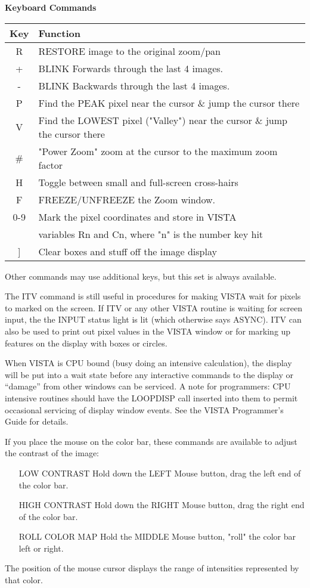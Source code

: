 \begin{center}
{\bf Keyboard Commands}\\
\begin{tabular}{cl}
\hline
Key & Function\\
\hline
 R &RESTORE image to the original zoom/pan\\
 + &BLINK Forwards through the last 4 images.\\
 - &BLINK Backwards through the last 4 images.\\
 P &Find the PEAK pixel near the cursor \& jump the cursor there\\
 V &Find the LOWEST pixel ("Valley") near the cursor \& jump the cursor there\\
 \# &"Power Zoom" zoom at the cursor to the maximum zoom factor\\
 H &Toggle between small and full-screen cross-hairs\\
 F &FREEZE/UNFREEZE the Zoom window.\\
0-9&Mark the pixel coordinates and store in VISTA\\
   &variables Rn and Cn, where "n" is the number key hit\\
 ] &Clear boxes and stuff off the image display\\
\hline
\end{tabular}
\end{center}

Other commands may use additional keys, but this set is always available.

The ITV command is still useful in procedures for making VISTA wait for
pixels to marked on the screen.  If ITV or any other VISTA routine is
waiting for screen input, the the INPUT status light is lit (which
otherwise says ASYNC).  ITV can also be used to print out pixel values in
the VISTA window or for marking up features on the display with boxes or
circles.

When VISTA is CPU bound (busy doing an intensive calculation), the display
will be put into a wait state before any interactive commands to the
display or ``damage'' from other windows can be serviced.  A note for
programmers: CPU intensive routines should have the LOOPDISP call inserted
into them to permit occasional servicing of display window events.  See the
VISTA Programmer's Guide for details.


If you place the mouse on the color bar, these commands are available
to adjust the contrast of the image:
\begin{itemize}
  \item[LOW CONTRAST]{Hold down the LEFT Mouse button, drag the left
       end of the color bar.}

  \item[HIGH CONTRAST]{Hold down the RIGHT Mouse button, drag the right
       end of the color bar.}

  \item[ROLL COLOR MAP]{Hold the MIDDLE Mouse button, "roll" the
       color bar left or right.}
\end{itemize} 
The position of the mouse cursor displays the range of intensities
represented by that color.
 
